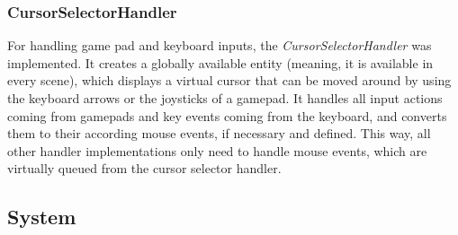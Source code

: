 \subsubsection{CursorSelectorHandler}\label{subsubsec:cursorselectorhandler}
For handling game pad and keyboard inputs, the \textit{CursorSelectorHandler} was implemented.
It creates a globally available entity (meaning, it is available in every scene), which displays a virtual cursor that can be
moved around by using the keyboard arrows or the joysticks of a gamepad.
It handles all input actions coming from gamepads and key events coming from the keyboard, and converts them to their according mouse events,
if necessary and defined.
This way, all other handler implementations only need to handle mouse events, which are virtually queued from the cursor selector handler.

\subsection{System}\label{subsec:system}
